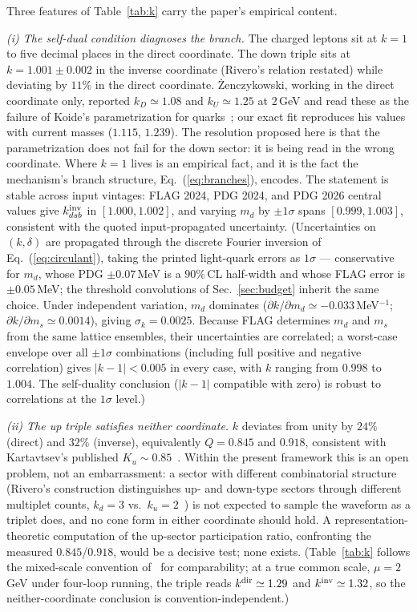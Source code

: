 \documentclass[11pt]{article}
\begin{document}
Three features of Table~\ref{tab:k} carry the paper's empirical content.

\emph{(i) The self-dual condition diagnoses the branch.} The charged leptons sit at
$k=1$ to five decimal places in the direct coordinate. The down triple sits at
$k = 1.001\pm0.002$ in the inverse coordinate (Rivero's relation restated)
while deviating by $11\%$ in the direct coordinate. \.{Z}enczykowski, working in
the direct coordinate only, reported $k_D \simeq 1.08$ and $k_U \simeq 1.25$ at
$2$\,GeV and read these as the failure of Koide's parametrization for
quarks~\cite{Zen2012}; our exact fit reproduces his values with current masses
($1.115$, $1.239$). The resolution proposed here is that the parametrization does
not fail for the down sector: it is being read in the wrong coordinate. Where
$k=1$ lives is an empirical fact, and it is the fact the mechanism's branch
structure, Eq.~(\ref{eq:branches}), encodes. The statement is stable across
input vintages: FLAG 2024, PDG 2024, and PDG 2026 central values give
$k^{\rm inv}_{dsb}$ in $[1.000, 1.002]$, and varying $m_d$ by $\pm1\sigma$
spans $[0.999, 1.003]$, consistent with the quoted input-propagated uncertainty. (Uncertainties on $(k, \delta)$ are propagated through the discrete Fourier inversion of Eq.~(\ref{eq:circulant}), taking the printed light-quark errors as $1\sigma$ --- conservative for $m_d$, whose PDG $\pm0.07$\,MeV is a $90\%$\,CL half-width and whose FLAG error is $\pm0.05$\,MeV; the threshold convolutions of Sec.~\ref{sec:budget} inherit the same choice. Under independent variation, $m_d$ dominates ($\partial k/\partial m_d \simeq -0.033$\,MeV$^{-1}$; $\partial k/\partial m_s \simeq 0.0014$), giving $\sigma_k = 0.0025$. Because FLAG determines $m_d$ and $m_s$ from the same lattice ensembles, their uncertainties are correlated; a worst-case envelope over all $\pm1\sigma$ combinations (including full positive and negative correlation) gives $|k-1| < 0.005$ in every case, with $k$ ranging from $0.998$ to $1.004$. The self-duality conclusion ($|k-1|$ compatible with zero) is robust to correlations at the $1\sigma$ level.)

\emph{(ii) The up triple satisfies neither coordinate.} $k$ deviates from unity by
$24\%$ (direct) and $32\%$ (inverse), equivalently $Q = 0.845$ and $0.918$,
consistent with Kartavtsev's published $K_u \sim 0.85$~\cite{Kartavtsev}. Within
the present framework this is an open problem, not an embarrassment: a sector with different combinatorial structure (Rivero's construction distinguishes up- and down-type sectors through different multiplet counts, $k_d=3$ vs.\ $k_u=2$~\cite{Rivero2024}) is not expected to sample the waveform as a
triplet does, and no cone form in either coordinate should hold. A
representation-theoretic computation of the up-sector participation ratio,
confronting the measured $0.845$/$0.918$, would be a decisive test; none exists. (Table~\ref{tab:k} follows the mixed-scale convention of~\cite{Zen2012} for comparability; at a true common scale, $\mu = 2$\,GeV under four-loop running, the triple reads $k^{\rm dir} \simeq 1.29$ and $k^{\rm inv} \simeq 1.32$, so the neither-coordinate conclusion is convention-independent.)
\end{document}

